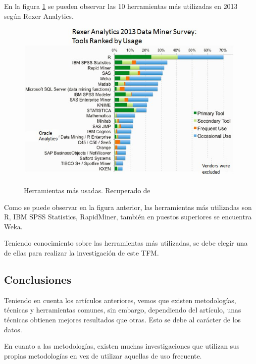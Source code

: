 En la figura \ref{fig:top10tools} se pueden observar las 10 herramientas más utilizadas en 2013 según Rexer Analytics.

\begin{figure}[htb]
	\centering
	\caption{Herramientas más usadas. Recuperado de \protect\cite{rexer2013}}
	\includegraphics[width=1\textwidth]{recursos/top10tools}
	\label{fig:top10tools}
\end{figure}
\FloatBarrier

Como se puede observar en la figura anterior, las herramientas más utilizadas son R, IBM SPSS Statistics, RapidMiner, también en puestos superiores se encuentra Weka.

Teniendo conocimiento sobre las herramientas más utilizadas, se debe elegir una de ellas para realizar la investigación de este TFM.


\subsection{Conclusiones}

Teniendo en cuenta los artículos anteriores, vemos que existen metodologías, técnicas y herramientas comunes, sin embargo, dependiendo del artículo, unas técnicas obtienen mejores resultados que otras. Esto se debe al carácter de los datos. 

En cuanto a las metodologías, existen muchas investigaciones que utilizan sus propias metodologías en vez de utilizar aquellas de uso frecuente.

